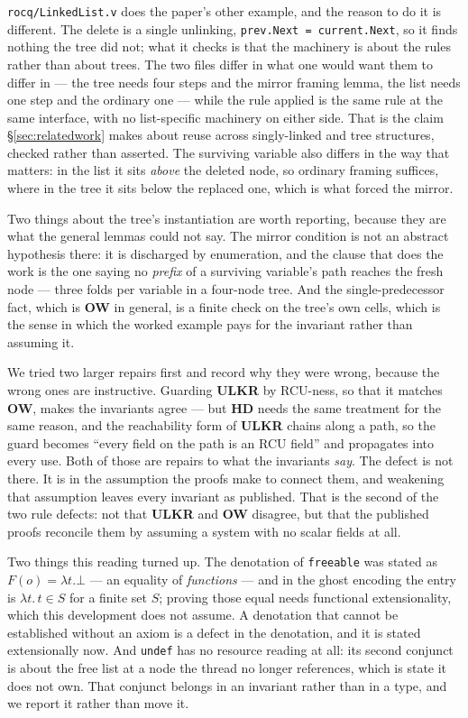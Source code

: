 \texttt{rocq/LinkedList.v} does the paper's other example, and the reason to do
it is different.  The delete is a single unlinking, \texttt{prev.Next =
current.Next}, so it finds nothing the tree did not; what it checks is that the
machinery is about the rules rather than about trees.  The two files differ in
what one would want them to differ in --- the tree needs four steps and the
mirror framing lemma, the list needs one step and the ordinary one --- while the
rule applied is the same rule at the same interface, with no list-specific
machinery on either side.  That is the claim \S\ref{sec:relatedwork} makes about
reuse across singly-linked and tree structures, checked rather than asserted.
The surviving variable also differs in the way that matters: in the list it sits
\emph{above} the deleted node, so ordinary framing suffices, where in the tree
it sits below the replaced one, which is what forced the mirror.

Two things about the tree's instantiation are worth reporting, because they are
what the general lemmas could not say.  The mirror condition is not an abstract
hypothesis there: it is discharged by enumeration, and the clause that does the
work is the one saying no \emph{prefix} of a surviving variable's path reaches
the fresh node --- three folds per variable in a four-node tree.  And the
single-predecessor fact, which is \textbf{OW} in general, is a finite check on
the tree's own cells, which is the sense in which the worked example pays for
the invariant rather than assuming it.

We tried two larger repairs first and record why they were wrong, because the
wrong ones are instructive.  Guarding \textbf{ULKR} by RCU-ness, so that it
matches \textbf{OW}, makes the invariants agree --- but \textbf{HD} needs the
same treatment for the same reason, and the reachability form of \textbf{ULKR}
chains along a path, so the guard becomes ``every field on the path is an RCU
field'' and propagates into every use.  Both of those are repairs to what the
invariants \emph{say}.  The defect is not there.  It is in the assumption the
proofs make to connect them, and weakening that assumption leaves every
invariant as published.  That is the second of the two rule defects: not that
\textbf{ULKR} and \textbf{OW} disagree, but that the published proofs reconcile
them by assuming a system with no scalar fields at all.

Two things this reading turned up.  The denotation of \texttt{freeable} was
stated as $F(o) = \lambda t. \bot$ --- an equality of \emph{functions} --- and
in the ghost encoding the entry is $\lambda t.\, t \in S$ for a finite set $S$;
proving those equal needs functional extensionality, which this development does
not assume.  A denotation that cannot be established without an axiom is a
defect in the denotation, and it is stated extensionally now.  And
\texttt{undef} has no resource reading at all: its second conjunct is about the
free list at a node the thread no longer references, which is state it does not
own.  That conjunct belongs in an invariant rather than in a type, and we report
it rather than move it.

